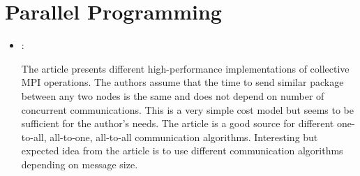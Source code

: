 \section*{Parallel Programming}
\begin{itemize}
    \item \cite{Thakur:MPIOptimization:2005}:

    The article presents different high-performance implementations of collective MPI operations. The authors assume that the time to send similar package between any two nodes is the same and does not depend on number of concurrent communications. This is a very simple cost model but seems to be sufficient for the author's needs. The article is a good source for different one-to-all, all-to-one, all-to-all communication algorithms. Interesting but expected idea from the article is to use different communication algorithms depending on message size.
\end{itemize}


